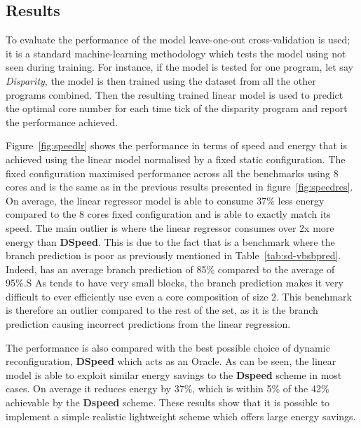 \subsection{Results}

To evaluate the performance of the model leave-one-out cross-validation  is used; it is a standard machine-learning methodology which tests the model using not seen during training.
For instance, if the model is tested for one program, let say \textit{Disparity}, the model is then trained using the dataset from all the other programs combined.
Then the resulting trained linear model is used to predict the optimal core number for each time tick of the disparity program and report the performance achieved.

Figure~\ref{fig:speedlr} shows the performance in terms of speed and energy that is achieved using the linear model normalised by a fixed static configuration.
The fixed configuration maximised performance across all the benchmarks using 8 cores and is the same as in the previous results presented in figure~\ref{fig:speedres}.
On average, the linear regressor model is able to consume 37\% less energy compared to the 8 cores fixed configuration and is able to exactly match its speed.
The main outlier is  where the linear regressor consumes over 2x more energy than \textbf{DSpeed}.
This is due to the fact that  is a benchmark where the branch prediction is poor as previously mentioned in Table~\ref{tab:sd-vbsbpred}.
Indeed,  has an average branch prediction of 85\% compared to the average of 95\%.S
As  tends to have very small blocks, the branch prediction makes it very difficult to ever efficiently use even a core composition of size 2.
This benchmark is therefore an outlier compared to the rest of the set, as it is the branch prediction causing incorrect predictions from the linear regression.

The performance is also compared with the best possible choice of dynamic reconfiguration, \textbf{DSpeed} which acts as an Oracle.
As can be seen, the linear model is able to exploit similar energy savings to the \textbf{Dspeed} scheme in most cases.
On average it reduces energy by 37\%, which is within 5\% of the 42\% achievable by the \textbf{Dspeed} scheme.
These results show that it is possible to implement a simple realistic lightweight scheme which offers large energy savings.
